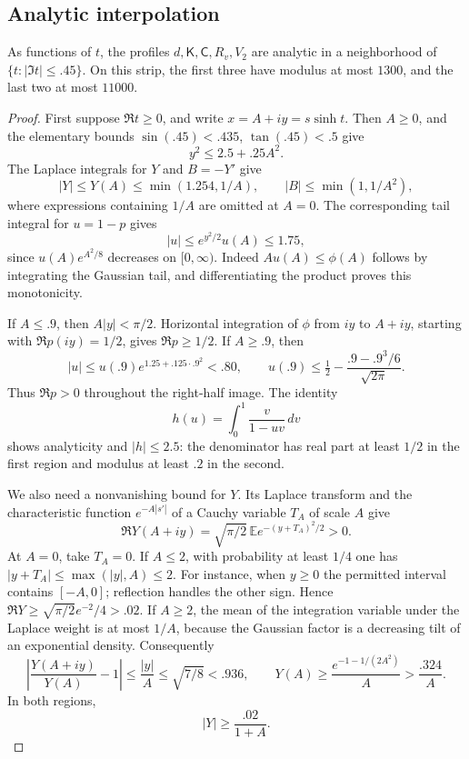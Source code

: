 \subsection{Analytic interpolation}

\begin{lemma}\label{lem:scalar-strip}
As functions of \(t\), the profiles
\(d,\mathsf K,\mathsf C,R_v,V_2\) are analytic in a neighborhood of
\(\{t:|\Im t|\le .45\}\). On this strip, the first three have modulus
at most \(1300\), and the last two at most \(11000\).
\end{lemma}

\begin{proof}
First suppose \(\Re t\ge0\), and write \(x=A+iy=s\sinh t\).
Then \(A\ge0\), and the elementary bounds
\(\sin(.45)<.435\), \(\tan(.45)<.5\) give
\[
 y^2\le2.5+.25A^2.
\]
The Laplace integrals for \(Y\) and \(B=-Y'\) give
\[
 |Y|\le Y(A)\le\min(1.254,1/A),\qquad
 |B|\le\min(1,1/A^2),
\]
where expressions containing \(1/A\) are omitted at \(A=0\).
The corresponding tail integral for \(u=1-p\) gives
\[
 |u|\le e^{y^2/2}u(A)\le1.75,
\]
since \(u(A)e^{A^2/8}\) decreases on \([0,\infty)\).
Indeed \(Au(A)\le\phi(A)\) follows by integrating the Gaussian tail,
and differentiating the product proves this monotonicity.

If \(A\le.9\), then \(A|y|<\pi/2\). Horizontal integration of
\(\phi\) from \(iy\) to \(A+iy\), starting with
\(\Re p(iy)=1/2\), gives \(\Re p\ge1/2\).
If \(A\ge.9\), then
\[
 |u|\le u(.9)e^{1.25+.125\cdot.9^2}<.80,
 \qquad
 u(.9)\le\tfrac12-\frac{.9-.9^3/6}{\sqrt{2\pi}}.
\]
Thus \(\Re p>0\) throughout the right-half image.
The identity
\[
 h(u)=\int_0^1\frac{v}{1-uv}\,dv
\]
shows analyticity and \(|h|\le2.5\): the denominator has real part at
least \(1/2\) in the first region and modulus at least \(.2\) in the
second.

We also need a nonvanishing bound for \(Y\). Its Laplace transform and
the characteristic function \(e^{-A|s'|}\) of a Cauchy variable \(T_A\)
of scale \(A\) give
\[
 \Re Y(A+iy)=\sqrt{\pi/2}\,
      \mathbb E e^{-(y+T_A)^2/2}>0.
\]
At \(A=0\), take \(T_A=0\). If \(A\le2\), with probability at least
\(1/4\) one has
\(|y+T_A|\le\max(|y|,A)\le2\). For instance, when \(y\ge0\)
the permitted interval contains \([-A,0]\); reflection handles the
other sign. Hence \(\Re Y\ge\sqrt{\pi/2}e^{-2}/4>.02\).
If \(A\ge2\), the mean of the integration variable under the
Laplace weight is at most \(1/A\), because the Gaussian factor is a
decreasing tilt of an exponential density. Consequently
\[
 \left|\frac{Y(A+iy)}{Y(A)}-1\right|\le\frac{|y|}{A}
 \le\sqrt{7/8}<.936,
 \qquad
 Y(A)\ge\frac{e^{-1-1/(2A^2)}}{A}>\frac{.324}{A}.
\]
In both regions,
\[
 |Y|\ge\frac{.02}{1+A}.
\]


\end{proof}
